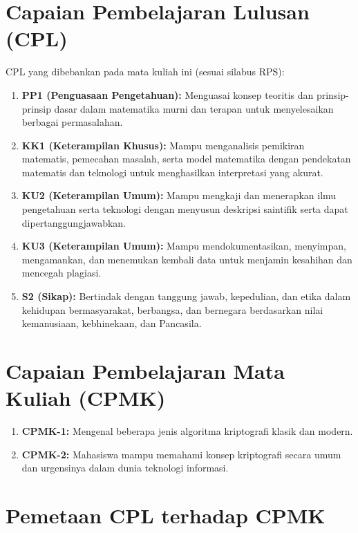 \documentclass[main.tex]{subfiles}
\begin{document}
\vspace{1cm}

\section*{Capaian Pembelajaran Lulusan (CPL)}

CPL yang dibebankan pada mata kuliah ini (sesuai silabus RPS):

\begin{enumerate}
  \item \textbf{PP1 (Penguasaan Pengetahuan):} Menguasai konsep teoritis dan prinsip-prinsip dasar dalam matematika murni dan terapan untuk menyelesaikan berbagai permasalahan.
  \item \textbf{KK1 (Keterampilan Khusus):} Mampu menganalisis pemikiran matematis, pemecahan masalah, serta model matematika dengan pendekatan matematis dan teknologi untuk menghasilkan interpretasi yang akurat.
  \item \textbf{KU2 (Keterampilan Umum):} Mampu mengkaji dan menerapkan ilmu pengetahuan serta teknologi dengan menyusun deskripsi saintifik serta dapat dipertanggungjawabkan.
  \item \textbf{KU3 (Keterampilan Umum):} Mampu mendokumentasikan, menyimpan, mengamankan, dan menemukan kembali data untuk menjamin kesahihan dan mencegah plagiasi.
  \item \textbf{S2 (Sikap):} Bertindak dengan tanggung jawab, kepedulian, dan etika dalam kehidupan bermasyarakat, berbangsa, dan bernegara berdasarkan nilai kemanusiaan, kebhinekaan, dan Pancasila.
\end{enumerate}

\section*{Capaian Pembelajaran Mata Kuliah (CPMK)}

\begin{enumerate}
  \item \textbf{CPMK-1:} Mengenal beberapa jenis algoritma kriptografi klasik dan modern.
  \item \textbf{CPMK-2:} Mahasiswa mampu memahami konsep kriptografi secara umum dan urgensinya dalam dunia teknologi informasi.
\end{enumerate}

\section*{Pemetaan CPL terhadap CPMK}
\end{document}
